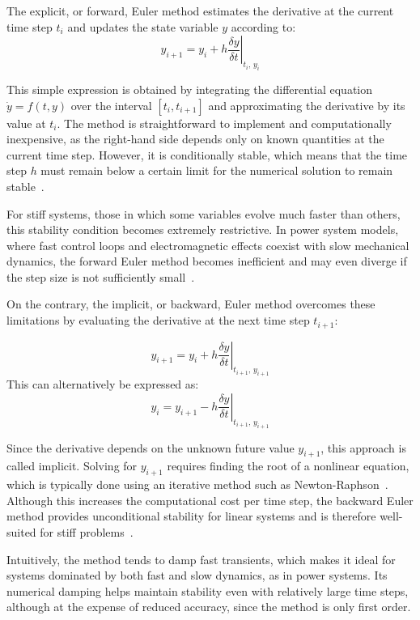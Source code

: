 The explicit, or forward, Euler method estimates the derivative at the current time step $t_i$ and updates the state variable $y$ according to:
\begin{equation}
    y_{i+1} = y_i + h \left.\frac{\delta y}{\delta t}\right|_{t_i, \, y_i}
    \label{eq:forward_euler}
\end{equation}

This simple expression is obtained by integrating the differential equation
$\dot{y} = f(t, y)$ over the interval $[t_i, t_{i+1}]$ and approximating the derivative by its value at $t_i$. The method is straightforward to implement and
computationally inexpensive, as the right-hand side depends only on known quantities at the current time step. However, it is conditionally stable,
which means that the time step $h$ must remain below a certain limit for the numerical solution to remain stable~\cite{Butcher2008}. 

For stiff systems, those in which some variables evolve much faster than others, this stability condition becomes extremely restrictive.
In power system models, where fast control loops and electromagnetic effects coexist with slow mechanical dynamics, the forward Euler method becomes inefficient and may
even diverge if the step size is not sufficiently small~\cite{LaraTDS}.

On the contrary, the implicit, or backward, Euler method overcomes these limitations by evaluating the derivative at the next time step $t_{i+1}$:

\begin{equation}
    y_{i+1} = y_i + h \left.\frac{\delta y}{\delta t}\right|_{t_{i+1}, \, y_{i+1}}
    \label{eq:backward_euler}
\end{equation}
This can alternatively be expressed as:
\begin{equation}
    y_i = y_{i+1} - h \left.\frac{\delta y}{\delta t}\right|_{t_{i+1}, \, y_{i+1}}
\end{equation}

Since the derivative depends on the unknown future value $y_{i+1}$, this approach is called implicit. Solving for $y_{i+1}$ requires finding the root of a
nonlinear equation, which is typically done using an iterative method such as Newton-Raphson~\cite{Hindmarsh1995}. Although this increases the computational cost per
time step, the backward Euler method provides unconditional stability for linear systems and is therefore well-suited for stiff problems~\cite{Butcher2008}. 

Intuitively, the method tends to damp fast transients, which makes it ideal for systems dominated by both fast and slow dynamics, as in power systems.
Its numerical damping helps maintain stability even with relatively large time steps, although at the expense of reduced accuracy, since the method is only first order.

